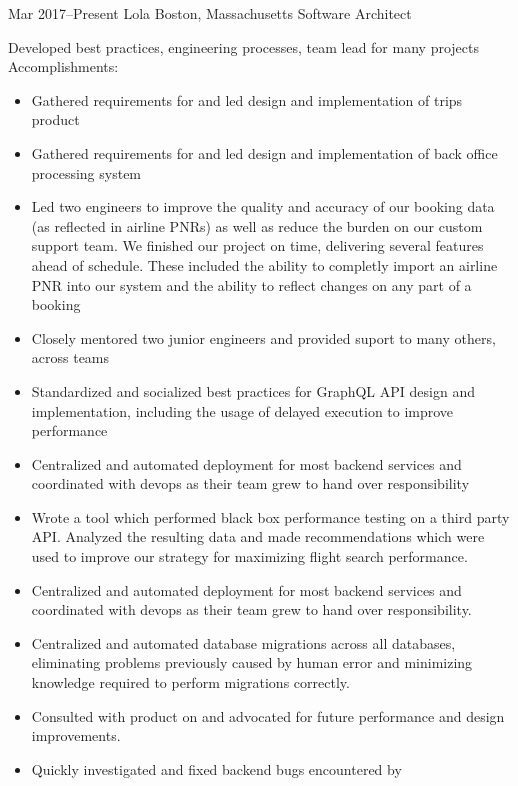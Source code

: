 \documentclass[]{friggeri-cv}
\begin{document}
\begin{entrylist}
  \entryalt
  {Mar 2017--Present}
  {Lola}
  {Boston, Massachusetts}
  {Software Architect}
  {Developed best practices, engineering processes, team lead for many
    projects \\
    Accomplishments:
    \begin{itemize}
    \item Gathered requirements for and led design and implementation
      of trips product
    \item Gathered requirements for and led design and implementation
      of back office processing system
    \item Led two engineers to improve the quality and accuracy of our
      booking data (as reflected in airline PNRs) as well as reduce
      the burden on our custom support team. We finished our project
      on time, delivering several features ahead of schedule. These
      included the ability to completly import an airline PNR into our
      system and the ability to reflect changes on any part of a
      booking
    \item Closely mentored two junior engineers and provided suport to
      many others, across teams
    \item Standardized and socialized best practices for GraphQL API
      design and implementation, including the usage of delayed
      execution to improve performance
    \item Centralized and automated deployment for most backend
      services and coordinated with devops as their team grew to hand
      over responsibility
    \item Wrote a tool which performed black box performance testing
      on a third party API. Analyzed the resulting data and made
      recommendations which were used to improve our strategy for
      maximizing flight search performance.
    \item Centralized and automated deployment for most backend
      services and coordinated with devops as their team grew to hand
      over responsibility.
    \item Centralized and automated database migrations across all
      databases, eliminating problems previously caused by human error
      and minimizing knowledge required to perform migrations
      correctly.
    \item Consulted with product on and advocated for future
      performance and design improvements.
    \item Quickly investigated and fixed backend bugs encountered by

\end{itemize}}
\end{entrylist}
\end{document}
